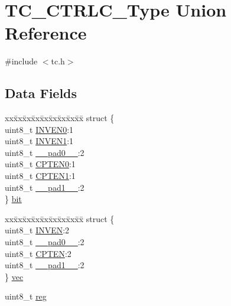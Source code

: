 \hypertarget{union_t_c___c_t_r_l_c___type}{}\section{T\+C\+\_\+\+C\+T\+R\+L\+C\+\_\+\+Type Union Reference}
\label{union_t_c___c_t_r_l_c___type}


{\ttfamily \#include $<$tc.\+h$>$}

\subsection*{Data Fields}
\begin{DoxyCompactItemize}
\item 
\begin{tabbing}
xx\=xx\=xx\=xx\=xx\=xx\=xx\=xx\=xx\=\kill
struct \{\\
\>uint8\_t \mbox{\hyperlink{union_t_c___c_t_r_l_c___type_ad6e530be75f9b07785a34f3fcd11ab6b}{INVEN0}}:1\\
\>uint8\_t \mbox{\hyperlink{union_t_c___c_t_r_l_c___type_aa349c15718a5e80d138c33e2cf4a0a6e}{INVEN1}}:1\\
\>uint8\_t \mbox{\hyperlink{union_t_c___c_t_r_l_c___type_a8b4eebe79ded0459acec2f4950102ba3}{\_\_pad0\_\_}}:2\\
\>uint8\_t \mbox{\hyperlink{union_t_c___c_t_r_l_c___type_a0553506b5f78f4c1c83e7b8607ee5c26}{CPTEN0}}:1\\
\>uint8\_t \mbox{\hyperlink{union_t_c___c_t_r_l_c___type_ac9378bf5987f49e55b3e2b25faa216af}{CPTEN1}}:1\\
\>uint8\_t \mbox{\hyperlink{union_t_c___c_t_r_l_c___type_a77f12d2e278bd5c07712648ac0df5e08}{\_\_pad1\_\_}}:2\\
\} \mbox{\hyperlink{union_t_c___c_t_r_l_c___type_a01dc4f47d7e316dabcd4380c60e2ec67}{bit}}\\

\end{tabbing}\item 
\begin{tabbing}
xx\=xx\=xx\=xx\=xx\=xx\=xx\=xx\=xx\=\kill
struct \{\\
\>uint8\_t \mbox{\hyperlink{union_t_c___c_t_r_l_c___type_a82992fd39d36d7c1996df7f4b6413dff}{INVEN}}:2\\
\>uint8\_t \mbox{\hyperlink{union_t_c___c_t_r_l_c___type_a8b4eebe79ded0459acec2f4950102ba3}{\_\_pad0\_\_}}:2\\
\>uint8\_t \mbox{\hyperlink{union_t_c___c_t_r_l_c___type_a36285b7da69c1540fc5575fb5492962d}{CPTEN}}:2\\
\>uint8\_t \mbox{\hyperlink{union_t_c___c_t_r_l_c___type_a77f12d2e278bd5c07712648ac0df5e08}{\_\_pad1\_\_}}:2\\
\} \mbox{\hyperlink{union_t_c___c_t_r_l_c___type_ab04ae8a0916b6a81adb4b5a86cfc1bb8}{vec}}\\

\end{tabbing}\item 
uint8\+\_\+t \mbox{\hyperlink{union_t_c___c_t_r_l_c___type_a9428adc9af4653a2050e2536b55dec8d}{reg}}
\end{DoxyCompactItemize}


